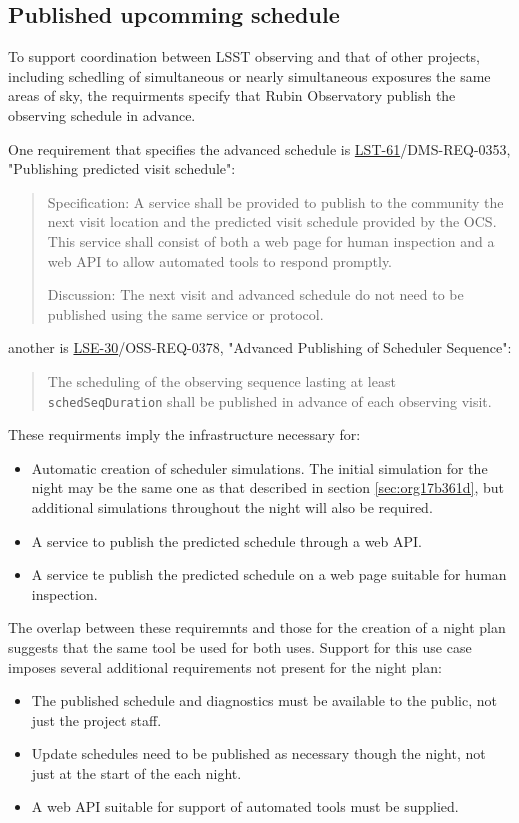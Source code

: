 \subsection{Published upcomming schedule}
\label{sec:org423a216}
To support coordination between LSST observing and that of other projects, including schedling of simultaneous or nearly simultaneous exposures the same areas of sky, the requirments specify that Rubin Observatory publish the observing schedule in advance.

One requirement that specifies the advanced schedule is \href{https://ls.st/lse-61}{LST-61}/DMS-REQ-0353, "Publishing predicted visit schedule":
\begin{quote}
Specification: A service shall be provided to publish to the community the next visit location and the predicted visit schedule provided by the OCS. This service shall consist of both a web page for human inspection and a web API to allow automated tools to respond promptly.

Discussion: The next visit and advanced schedule do not need to be published using the same service or protocol.
\end{quote}
another is \href{https://ls.st/lse-30}{LSE-30}/OSS-REQ-0378, "Advanced Publishing of Scheduler Sequence":
\begin{quote}
The scheduling of the observing sequence lasting at least \texttt{schedSeqDuration} shall be published in advance of each observing visit.
\end{quote}

These requirments imply the infrastructure necessary for:
\begin{itemize}
\item Automatic creation of scheduler simulations. The initial simulation for the night may be the same one as that described in section \ref{sec:org17b361d}, but additional simulations throughout the night will also be required.
\item A service to publish the predicted schedule through a web API.
\item A service te publish the predicted schedule on a web page suitable for human inspection.
\end{itemize}

The overlap between these requiremnts and those for the creation of a night plan suggests that the same tool be used for both uses. 
Support for this use case imposes several additional requirements not present for the night plan:
\begin{itemize}
\item The published schedule and diagnostics must be available to the public, not just the project staff.
\item Update schedules need to be published as necessary though the night, not just at the start of the each night.
\item A web API suitable for support of automated tools must be supplied.
\end{itemize}

